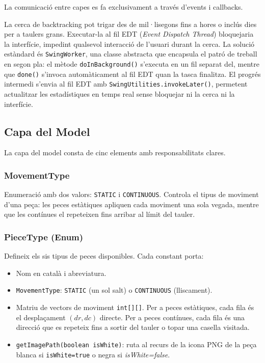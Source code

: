 \documentclass[conference,compsoc]{IEEEtran}
\begin{document}
La comunicació entre capes es fa exclusivament a través d'events
i callbacks.

La cerca de backtracking pot trigar des de mil·lisegons fins a
hores o inclús dies per a taulers grans. Executar-la al fil EDT
(\textit{Event Dispatch Thread}) bloquejaria la interfície, impedint
qualsevol interacció de l'usuari durant la cerca. La solució estàndard
és \texttt{SwingWorker},
una classe abstracta que encapsula el patró de treball en segon pla:
el mètode \texttt{doInBackground()} s'executa en un fil separat del,
mentre que \texttt{done()} s'invoca
automàticament al fil EDT quan la tasca finalitza. El progrés
intermedi s'envia al fil EDT amb \texttt{SwingUtilities.invokeLater()},
permetent actualitzar les estadístiques en temps real sense bloquejar
ni la cerca ni la interfície.

\subsection{Capa del Model}

La capa del model consta de cinc elements amb responsabilitats clares.

\subsubsection{MovementType}

Enumeració amb dos valors: \texttt{STATIC} i \texttt{CONTINUOUS}.
Controla el tipus de moviment d'una peça: les peces estàtiques
apliquen cada moviment una sola vegada, mentre que les contínues el
repeteixen fins arribar al límit del tauler.

\subsubsection{PieceType (Enum)}

Defineix els sis tipus de peces disponibles. Cada constant porta:
\begin{itemize}
    \item Nom en català i abreviatura.
    \item \texttt{MovementType}: \texttt{STATIC} (un sol salt) o
          \texttt{CONTINUOUS} (lliscament).
    \item Matriu de vectors de moviment \texttt{int[][]}. Per a peces
          estàtiques, cada fila és el desplaçament $(dr, dc)$ directe.
          Per a peces contínues, cada fila és una direcció que es
          repeteix fins a sortir del tauler o topar una casella visitada.
    \item \texttt{getImagePath(boolean isWhite)}: ruta al recurs de la
          icona PNG de la peça blanca si \texttt{isWhite=true} o negra si \textit{isWhite=false}.
\end{itemize}
\end{document}
